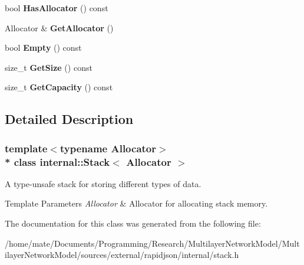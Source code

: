 \begin{DoxyCompactItemize}
\item 
bool {\bfseries Has\+Allocator} () const \hypertarget{classinternal_1_1Stack_a6cd7033d53a1da185ea6dc2e15f7234c}{}\label{classinternal_1_1Stack_a6cd7033d53a1da185ea6dc2e15f7234c}

\item 
Allocator \& {\bfseries Get\+Allocator} ()\hypertarget{classinternal_1_1Stack_ab01f693833dfe136f574d66547623cfa}{}\label{classinternal_1_1Stack_ab01f693833dfe136f574d66547623cfa}

\item 
bool {\bfseries Empty} () const \hypertarget{classinternal_1_1Stack_abf57d1c7b356d8acbbe0e79147ca4b5c}{}\label{classinternal_1_1Stack_abf57d1c7b356d8acbbe0e79147ca4b5c}

\item 
size\+\_\+t {\bfseries Get\+Size} () const \hypertarget{classinternal_1_1Stack_ade4a25fa82950619652a30aa3a807f58}{}\label{classinternal_1_1Stack_ade4a25fa82950619652a30aa3a807f58}

\item 
size\+\_\+t {\bfseries Get\+Capacity} () const \hypertarget{classinternal_1_1Stack_a61dea1ed780c07bb438d17c581ab0e48}{}\label{classinternal_1_1Stack_a61dea1ed780c07bb438d17c581ab0e48}

\end{DoxyCompactItemize}


\subsection{Detailed Description}
\subsubsection*{template$<$typename Allocator$>$\\*
class internal\+::\+Stack$<$ Allocator $>$}

A type-\/unsafe stack for storing different types of data. 


\begin{DoxyTemplParams}{Template Parameters}
{\em Allocator} & Allocator for allocating stack memory. \\
\hline
\end{DoxyTemplParams}


The documentation for this class was generated from the following file\+:\begin{DoxyCompactItemize}
\item 
/home/mate/\+Documents/\+Programming/\+Research/\+Multilayer\+Network\+Model/\+Multilayer\+Network\+Model/sources/external/rapidjson/internal/stack.\+h\end{DoxyCompactItemize}
